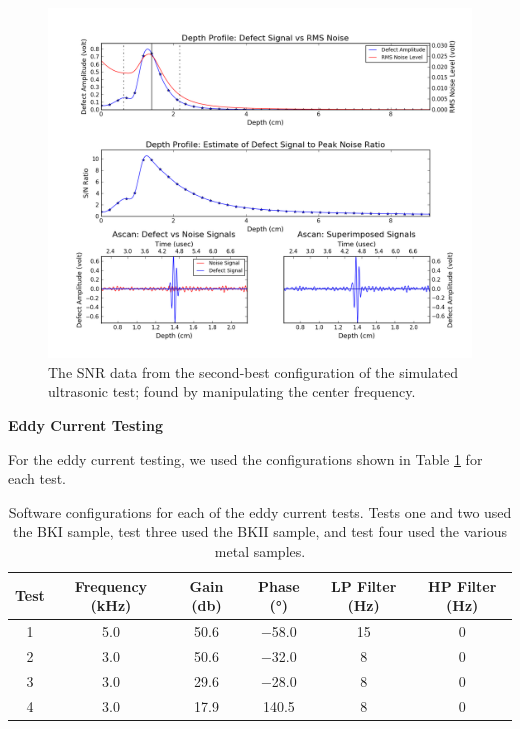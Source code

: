 \documentclass[12 pt]{report}
\begin{document}
\begin{figure}[htbp]
	\centering
	\includegraphics[width=6in]{images/graphs/simulated ultrasonic testing/s4_g2_i1_15}
	\caption{The SNR data from the second-best configuration of the simulated ultrasonic test; found by manipulating the center frequency.}
	\label{fig:sut_3}
\end{figure}

\newpage

\textbf{Eddy Current Testing}

For the eddy current testing, we used the configurations shown in Table \ref{tbl:ec} for each test.

\begin{table}[!htbp]
\caption{Software configurations for each of the eddy current tests. Tests one and two used the BKI sample, test three used the BKII sample, and test four used the various metal samples.}
\begin{center}
	\begin{tabular}{cccccc}
		\toprule
		Test&Frequency (\unit{\kilo\hertz})&Gain (\unit{\decibel})&Phase (\unit{\degree})&LP Filter (\unit{\hertz})&HP Filter (\unit{\hertz})\\
		\midrule
		1&\num{5.0}&\num{50.6}&\num{-58.0}&\num{15}&\num{0}\\
		2&\num{3.0}&\num{50.6}&\num{-32.0}&\num{8}&\num{0}\\
		3&\num{3.0}&\num{29.6}&\num{-28.0}&\num{8}&\num{0}\\
		4&\num{3.0}&\num{17.9}&\num{140.5}&\num{8}&\num{0}\\
		\bottomrule
	\end{tabular}
\end{center}
\label{tbl:ec}
\end{table}
\end{document}
